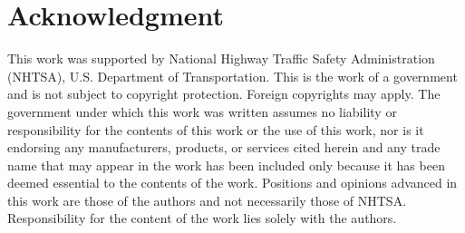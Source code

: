 \documentclass[journal]{IEEEtran}
\begin{document}
\section*{Acknowledgment}
This work was supported by National Highway Traffic Safety Administration (NHTSA), U.S. Department of Transportation. This is the work of a government and is not subject to copyright protection. Foreign copyrights may apply. The government under which this work was written assumes no liability or responsibility for the contents of this work or the use of this work, nor is it endorsing any manufacturers, products, or services cited herein and any trade name that may appear in the work has been included only because it has been deemed essential to the contents of the work. Positions and opinions advanced in this work are those of the authors and not necessarily those of NHTSA. Responsibility for the content of the work lies solely with the authors. 



\end{document}
